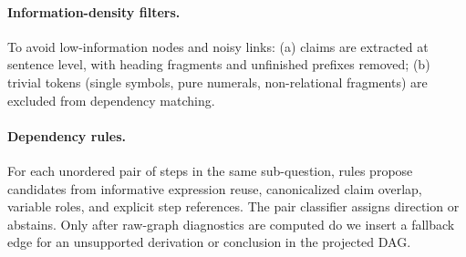 \paragraph{Information-density filters.}
To avoid low-information nodes and noisy links: (a) claims are extracted at sentence level, with heading fragments and unfinished prefixes removed; (b) trivial tokens (single symbols, pure numerals, non-relational fragments) are excluded from dependency matching.

\paragraph{Dependency rules.}
For each unordered pair of steps in the same sub-question, rules propose candidates from informative expression reuse, canonicalized claim overlap, variable roles, and explicit step references. The pair classifier assigns direction or abstains. Only after raw-graph diagnostics are computed do we insert a fallback edge for an unsupported derivation or conclusion in the projected DAG.

